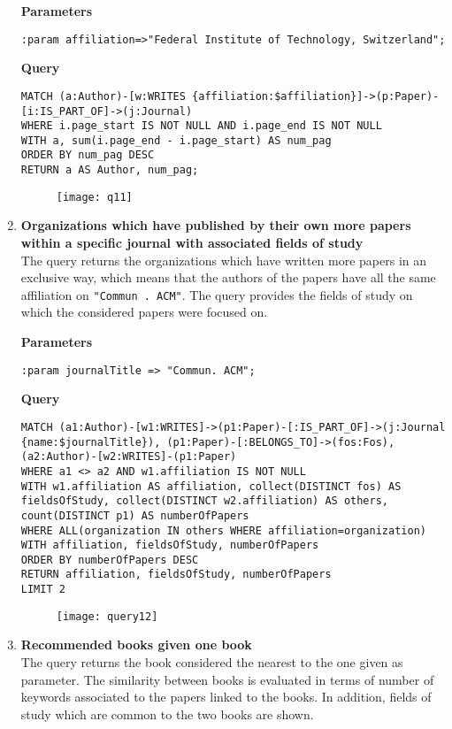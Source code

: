 \begin{enumerate}
    \textbf{Parameters}
    \begin{lstlisting}[label={lst:lstlisting41}]
:param affiliation=>"Federal Institute of Technology, Switzerland";
    \end{lstlisting}
    \textbf{Query}
    \begin{lstlisting}[label={lst:lstlisting42}]
MATCH (a:Author)-[w:WRITES {affiliation:$affiliation}]->(p:Paper)-[i:IS_PART_OF]->(j:Journal)
WHERE i.page_start IS NOT NULL AND i.page_end IS NOT NULL
WITH a, sum(i.page_end - i.page_start) AS num_pag
ORDER BY num_pag DESC
RETURN a AS Author, num_pag;
    \end{lstlisting}
    \begin{figure}[H]
        \begin{center}
            \texttt{[image: q11]}
            \label{fig:q11}%
        \end{center}
    \end{figure}
    \item \textbf{Organizations which have published by their own more papers within a specific journal with associated fields of study}\\
    The query returns the organizations which have written more papers in an exclusive way, which means that the authors of the papers have all the same affiliation on \verb|"Commun . ACM"|.
    The query provides the fields of study on which the considered papers were focused on.

    \textbf{Parameters}
    \begin{lstlisting}[label={lst:lstlisting43}]
:param journalTitle => "Commun. ACM";
    \end{lstlisting}
    \textbf{Query}
    \begin{lstlisting}[label={lst:lstlisting44}]
MATCH (a1:Author)-[w1:WRITES]->(p1:Paper)-[:IS_PART_OF]->(j:Journal {name:$journalTitle}), (p1:Paper)-[:BELONGS_TO]->(fos:Fos), (a2:Author)-[w2:WRITES]-(p1:Paper)
WHERE a1 <> a2 AND w1.affiliation IS NOT NULL
WITH w1.affiliation AS affiliation, collect(DISTINCT fos) AS fieldsOfStudy, collect(DISTINCT w2.affiliation) AS others, count(DISTINCT p1) AS numberOfPapers
WHERE ALL(organization IN others WHERE affiliation=organization)
WITH affiliation, fieldsOfStudy, numberOfPapers
ORDER BY numberOfPapers DESC
RETURN affiliation, fieldsOfStudy, numberOfPapers
LIMIT 2
    \end{lstlisting}
    \begin{figure}[H]
        \begin{center}
            \texttt{[image: query12]}
            \label{fig:query12}%
        \end{center}
    \end{figure}
    \item \textbf{Recommended books given one book}\\
    The query returns the book considered the nearest to the one given as parameter.
    The similarity between books is evaluated in terms of number of keywords associated to the papers linked to the books.
    In addition, fields of study which are common to the two books are shown.


\end{enumerate}
